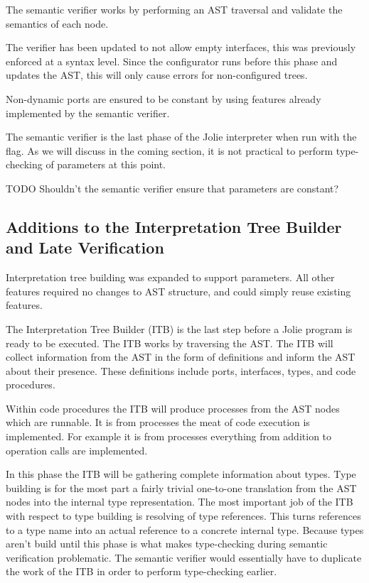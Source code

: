 The semantic verifier works by performing an AST traversal and validate the
semantics of each node.

The verifier has been updated to not allow empty interfaces, this was
previously enforced at a syntax level. Since the configurator runs before this
phase and updates the AST, this will only cause errors for non-configured
trees.

Non-dynamic ports are ensured to be constant by using features already
implemented by the semantic verifier.

The semantic verifier is the last phase of the Jolie interpreter when run with
the  flag. As we will discuss in the coming section, it is not
practical to perform type-checking of parameters at this point.

TODO Shouldn't the semantic verifier ensure that parameters are constant?

\subsection{Additions to the Interpretation Tree Builder and Late Verification}

Interpretation tree building was expanded to support parameters. All other
features required no changes to AST structure, and could simply reuse existing
features.

The Interpretation Tree Builder (ITB) is the last step before a Jolie program
is ready to be executed. The ITB works by traversing the AST. The ITB will
collect information from the AST in the form of definitions and inform the AST
about their presence. These definitions include ports, interfaces, types, and
code procedures.

Within code procedures the ITB will produce processes from the AST nodes which
are runnable. It is from processes the meat of code execution is implemented.
For example it is from processes everything from addition to operation calls
are implemented.

In this phase the ITB will be gathering complete information about types. Type
building is for the most part a fairly trivial one-to-one translation from the
AST nodes into the internal type representation. The most important job of the
ITB with respect to type building is resolving of type references. This turns
references to a type name into an actual reference to a concrete internal type.
Because types aren't build until this phase is what makes type-checking during
semantic verification problematic. The semantic verifier would essentially have
to duplicate the work of the ITB in order to perform type-checking earlier.

